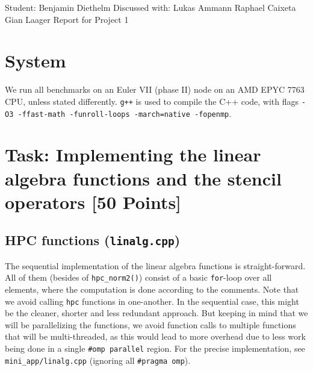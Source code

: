 \documentclass[unicode,10pt,a4paper,oneside,numbers=endperiod,openany]{scrartcl}
\begin{document}
\setassignment
{}

            {Student: Benjamin Diethelm}
            {Discussed with: Lukas Ammann \linebreak \null\hfill Raphael Caixeta \linebreak \null\hfill Gian Laager}
            {Report for Project 1}{}
\newline

 \section{System} We run all benchmarks on an Euler VII (phase II) node on an AMD EPYC 7763 CPU, unless stated differently. \texttt{g++} is used to compile the C++ code, with flags \texttt{-O3 -ffast-math -funroll-loops -march=native -fopenmp}.

\section{Task: Implementing the linear algebra functions and the stencil operators [50 Points]} \subsection{HPC functions (\texttt{linalg.cpp})} The sequential implementation of the linear algebra functions is straight-forward. All of them (besides of \texttt{hpc\_norm2()}) consist of a basic \texttt{for}-loop over all elements, where the computation is done according to the comments. Note that we avoid calling \texttt{hpc} functions in one-another. In the sequential case, this might be the cleaner, shorter and less redundant approach. But keeping in mind that we will be parallelizing the functions, we avoid function calls to multiple functions that will be multi-threaded, as this would lead to more overhead due to less work being done in a single \texttt{\#omp parallel} region. For the precise implementation, see \texttt{mini\_app/linalg.cpp} (ignoring all \texttt{\#pragma omp}).
\end{document}
